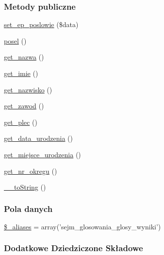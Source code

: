 \subsubsection*{Metody publiczne}
\begin{DoxyCompactItemize}
\item 
\hyperlink{classep___glosowanie___sejmowe___glos_a6a354494d54778bcc9254b5826b5f28c}{set\-\_\-ep\-\_\-poslowie} (\$data)
\item 
\hyperlink{classep___glosowanie___sejmowe___glos_ad3b9fc55831f7bcabb4870306bc08f4b}{posel} ()
\item 
\hyperlink{classep___glosowanie___sejmowe___glos_ac0818f0049d7b84f08f77128f54cee36}{get\-\_\-nazwa} ()
\item 
\hyperlink{classep___glosowanie___sejmowe___glos_ac4b0c85dc2a130038f2d118dbd0c3d77}{get\-\_\-imie} ()
\item 
\hyperlink{classep___glosowanie___sejmowe___glos_abdd1d7ff92508da7f748ba1feec97af0}{get\-\_\-nazwisko} ()
\item 
\hyperlink{classep___glosowanie___sejmowe___glos_af80ca8310b60004454dd02a387deaa2c}{get\-\_\-zawod} ()
\item 
\hyperlink{classep___glosowanie___sejmowe___glos_ac7f9af5c3fa024e4c26a7b6bd4ce4bb4}{get\-\_\-plec} ()
\item 
\hyperlink{classep___glosowanie___sejmowe___glos_a880b240cd2d8c336fd1709bf0cb1ae2c}{get\-\_\-data\-\_\-urodzenia} ()
\item 
\hyperlink{classep___glosowanie___sejmowe___glos_ac57c08ec5e394a19c5bd9280c8376182}{get\-\_\-miejsce\-\_\-urodzenia} ()
\item 
\hyperlink{classep___glosowanie___sejmowe___glos_a2645a9f0aa5b0ccc482943348c033d0a}{get\-\_\-nr\-\_\-okregu} ()
\item 
\hyperlink{classep___glosowanie___sejmowe___glos_a7516ca30af0db3cdbf9a7739b48ce91d}{\-\_\-\-\_\-to\-String} ()
\end{DoxyCompactItemize}
\subsubsection*{Pola danych}
\begin{DoxyCompactItemize}
\item 
\hyperlink{classep___glosowanie___sejmowe___glos_ab4e31d75f0bc5d512456911e5d01366b}{\$\-\_\-aliases} = array('sejm\-\_\-glosowania\-\_\-glosy\-\_\-wyniki')
\end{DoxyCompactItemize}
\subsubsection*{Dodatkowe Dziedziczone Składowe}


